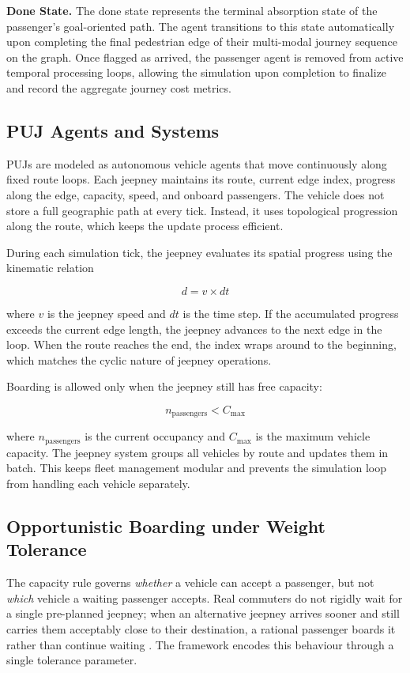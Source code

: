 {{\textbf{Done State.} The done state represents the terminal absorption state of the passenger's goal-oriented path. The agent transitions to this state automatically upon completing the final pedestrian edge of their multi-modal journey sequence on the graph. Once flagged as arrived, the passenger agent is removed from active temporal processing loops, allowing the simulation upon completion to finalize and record the aggregate journey cost metrics.

\subsection{PUJ Agents and Systems}
\noindent
\ac{PUJ}s are modeled as autonomous vehicle agents that move continuously along fixed route loops. Each jeepney maintains its route, current edge index, progress along the edge, capacity, speed, and onboard passengers. The vehicle does not store a full geographic path at every tick. Instead, it uses topological progression along the route, which keeps the update process efficient.

During each simulation tick, the jeepney evaluates its spatial progress using the kinematic relation

\[
d = v \times dt
\]

where $v$ is the jeepney speed and $dt$ is the time step. If the accumulated progress exceeds the current edge length, the jeepney advances to the next edge in the loop. When the route reaches the end, the index wraps around to the beginning, which matches the cyclic nature of jeepney operations.

Boarding is allowed only when the jeepney still has free capacity:

\[
n_{\text{passengers}} < C_{\text{max}}
\]

where $n_{\text{passengers}}$ is the current occupancy and $C_{\text{max}}$ is the maximum vehicle capacity. The jeepney system groups all vehicles by route and updates them in batch. This keeps fleet management modular and prevents the simulation loop from handling each vehicle separately.

\subsection{Opportunistic Boarding under Weight Tolerance}
\noindent
The capacity rule governs \emph{whether} a vehicle can accept a passenger, but not \emph{which} vehicle a waiting passenger accepts. Real commuters do not rigidly wait for a single pre-planned jeepney; when an alternative jeepney arrives sooner and still carries them acceptably close to their destination, a rational passenger boards it rather than continue waiting \citep{iseki2009transfers}. The framework encodes this behaviour through a single tolerance parameter.

}}
